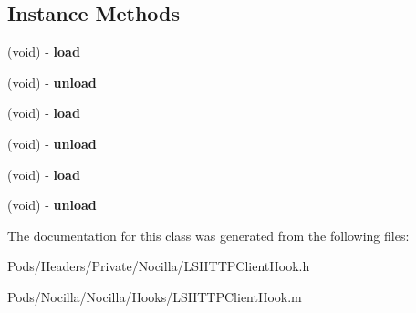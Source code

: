 \subsection*{Instance Methods}
\begin{DoxyCompactItemize}
\item 
\hypertarget{interface_l_s_h_t_t_p_client_hook_ad6554d3d96724b9323d320cab8efc453}{(void) -\/ {\bfseries load}}\label{interface_l_s_h_t_t_p_client_hook_ad6554d3d96724b9323d320cab8efc453}

\item 
\hypertarget{interface_l_s_h_t_t_p_client_hook_aa4b3ebde562312bc326758438b20caba}{(void) -\/ {\bfseries unload}}\label{interface_l_s_h_t_t_p_client_hook_aa4b3ebde562312bc326758438b20caba}

\item 
\hypertarget{interface_l_s_h_t_t_p_client_hook_ad6554d3d96724b9323d320cab8efc453}{(void) -\/ {\bfseries load}}\label{interface_l_s_h_t_t_p_client_hook_ad6554d3d96724b9323d320cab8efc453}

\item 
\hypertarget{interface_l_s_h_t_t_p_client_hook_aa4b3ebde562312bc326758438b20caba}{(void) -\/ {\bfseries unload}}\label{interface_l_s_h_t_t_p_client_hook_aa4b3ebde562312bc326758438b20caba}

\item 
\hypertarget{interface_l_s_h_t_t_p_client_hook_ad6554d3d96724b9323d320cab8efc453}{(void) -\/ {\bfseries load}}\label{interface_l_s_h_t_t_p_client_hook_ad6554d3d96724b9323d320cab8efc453}

\item 
\hypertarget{interface_l_s_h_t_t_p_client_hook_aa4b3ebde562312bc326758438b20caba}{(void) -\/ {\bfseries unload}}\label{interface_l_s_h_t_t_p_client_hook_aa4b3ebde562312bc326758438b20caba}

\end{DoxyCompactItemize}


The documentation for this class was generated from the following files\-:\begin{DoxyCompactItemize}
\item 
Pods/\-Headers/\-Private/\-Nocilla/L\-S\-H\-T\-T\-P\-Client\-Hook.\-h\item 
Pods/\-Nocilla/\-Nocilla/\-Hooks/L\-S\-H\-T\-T\-P\-Client\-Hook.\-m\end{DoxyCompactItemize}
